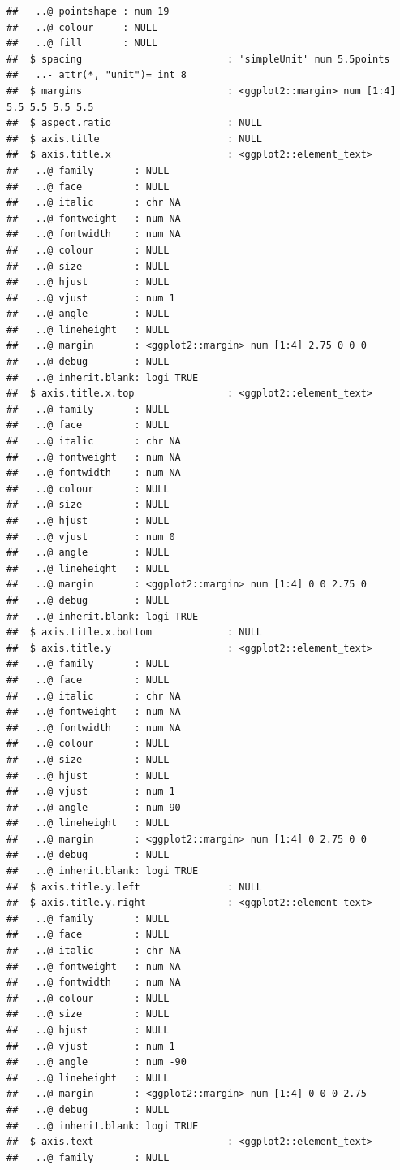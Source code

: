 \documentclass[
]{article}
\begin{document}
\begin{verbatim}
##   ..@ pointshape : num 19
##   ..@ colour     : NULL
##   ..@ fill       : NULL
##  $ spacing                         : 'simpleUnit' num 5.5points
##   ..- attr(*, "unit")= int 8
##  $ margins                         : <ggplot2::margin> num [1:4] 5.5 5.5 5.5 5.5
##  $ aspect.ratio                    : NULL
##  $ axis.title                      : NULL
##  $ axis.title.x                    : <ggplot2::element_text>
##   ..@ family       : NULL
##   ..@ face         : NULL
##   ..@ italic       : chr NA
##   ..@ fontweight   : num NA
##   ..@ fontwidth    : num NA
##   ..@ colour       : NULL
##   ..@ size         : NULL
##   ..@ hjust        : NULL
##   ..@ vjust        : num 1
##   ..@ angle        : NULL
##   ..@ lineheight   : NULL
##   ..@ margin       : <ggplot2::margin> num [1:4] 2.75 0 0 0
##   ..@ debug        : NULL
##   ..@ inherit.blank: logi TRUE
##  $ axis.title.x.top                : <ggplot2::element_text>
##   ..@ family       : NULL
##   ..@ face         : NULL
##   ..@ italic       : chr NA
##   ..@ fontweight   : num NA
##   ..@ fontwidth    : num NA
##   ..@ colour       : NULL
##   ..@ size         : NULL
##   ..@ hjust        : NULL
##   ..@ vjust        : num 0
##   ..@ angle        : NULL
##   ..@ lineheight   : NULL
##   ..@ margin       : <ggplot2::margin> num [1:4] 0 0 2.75 0
##   ..@ debug        : NULL
##   ..@ inherit.blank: logi TRUE
##  $ axis.title.x.bottom             : NULL
##  $ axis.title.y                    : <ggplot2::element_text>
##   ..@ family       : NULL
##   ..@ face         : NULL
##   ..@ italic       : chr NA
##   ..@ fontweight   : num NA
##   ..@ fontwidth    : num NA
##   ..@ colour       : NULL
##   ..@ size         : NULL
##   ..@ hjust        : NULL
##   ..@ vjust        : num 1
##   ..@ angle        : num 90
##   ..@ lineheight   : NULL
##   ..@ margin       : <ggplot2::margin> num [1:4] 0 2.75 0 0
##   ..@ debug        : NULL
##   ..@ inherit.blank: logi TRUE
##  $ axis.title.y.left               : NULL
##  $ axis.title.y.right              : <ggplot2::element_text>
##   ..@ family       : NULL
##   ..@ face         : NULL
##   ..@ italic       : chr NA
##   ..@ fontweight   : num NA
##   ..@ fontwidth    : num NA
##   ..@ colour       : NULL
##   ..@ size         : NULL
##   ..@ hjust        : NULL
##   ..@ vjust        : num 1
##   ..@ angle        : num -90
##   ..@ lineheight   : NULL
##   ..@ margin       : <ggplot2::margin> num [1:4] 0 0 0 2.75
##   ..@ debug        : NULL
##   ..@ inherit.blank: logi TRUE
##  $ axis.text                       : <ggplot2::element_text>
##   ..@ family       : NULL

\end{verbatim}
\end{document}
